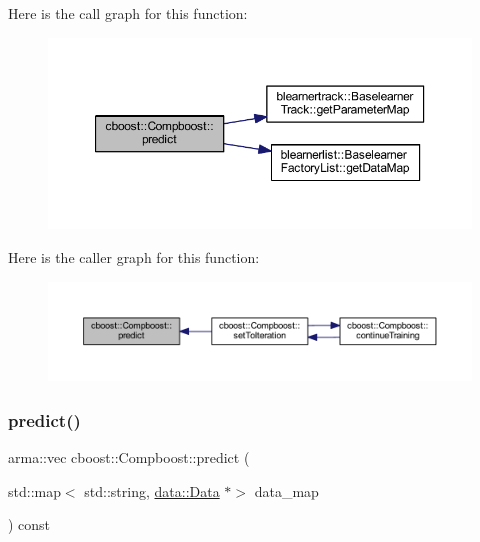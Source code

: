 Here is the call graph for this function\+:\nopagebreak
\begin{figure}[H]
\begin{center}
\leavevmode
\includegraphics[width=350pt]{classcboost_1_1_compboost_a32d1066a24607ff6ef2f934002adf62b_cgraph}
\end{center}
\end{figure}
Here is the caller graph for this function\+:\nopagebreak
\begin{figure}[H]
\begin{center}
\leavevmode
\includegraphics[width=350pt]{classcboost_1_1_compboost_a32d1066a24607ff6ef2f934002adf62b_icgraph}
\end{center}
\end{figure}
\mbox{\label{classcboost_1_1_compboost_a1779a0c89cf9da32b250c0c083631c58}} 
\subsubsection{\texorpdfstring{predict()}{predict()}\hspace{0.1cm}{\footnotesize\ttfamily [2/2]}}
{\footnotesize\ttfamily arma\+::vec cboost\+::\+Compboost\+::predict (\begin{DoxyParamCaption}\item[{std\+::map$<$ std\+::string, \mbox{\hyperlink{classdata_1_1_data}{data\+::\+Data}} $\ast$$>$}]{data\+\_\+map }\end{DoxyParamCaption}) const}

